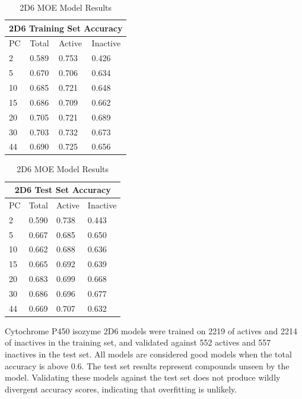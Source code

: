 \begin{table}[H]
\caption{2D6 MOE Model Results}
\begin{minipage}{.5\linewidth}
\centering
\begin{tabular}{|l|l|l|l|}
\hline
\multicolumn{4}{|c|}{2D6 Training Set Accuracy} \\ \hline
PC & Total          & Active          & Inactive\\ \hline
2  & 0.589          & 0.753           & 0.426   \\ \hline
5  & 0.670          & 0.706           & 0.634   \\ \hline
10 & 0.685          & 0.721           & 0.648   \\ \hline
15 & 0.686          & 0.709           & 0.662   \\ \hline
20 & 0.705          & 0.721           & 0.689   \\ \hline
30 & 0.703          & 0.732           & 0.673   \\ \hline
44 & 0.690          & 0.725           & 0.656   \\ \hline
\end{tabular}
\end{minipage}
\begin{minipage}{.5\linewidth}
\centering
\begin{tabular}{|l|l|l|l|}
\hline
\multicolumn{4}{|c|}{2D6 Test Set Accuracy}      \\ \hline
PC & Total          & Active          & Inactive \\ \hline
2  & 0.590          & 0.738           & 0.443    \\ \hline
5  & 0.667          & 0.685           & 0.650    \\ \hline
10 & 0.662          & 0.688           & 0.636    \\ \hline
15 & 0.665          & 0.692           & 0.639    \\ \hline
20 & 0.683          & 0.699           & 0.668    \\ \hline
30 & 0.686          & 0.696           & 0.677    \\ \hline
44 & 0.669          & 0.707           & 0.632    \\ \hline
\end{tabular}
\end{minipage}
\end{table}

Cytochrome P450 isozyme 2D6 models were trained on 2219 of actives and 2214 of inactives in the training set, and validated against 552 actives and 557 inactives in the test set. All models are considered good models when the total accuracy is above 0.6. The test set results represent compounds unseen by the model. Validating these models against the test set does not produce wildly divergent accuracy scores, indicating that overfitting is unlikely.

